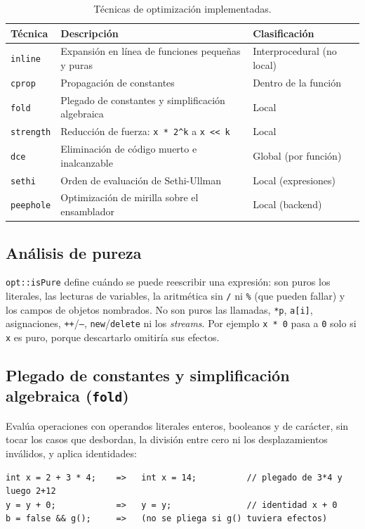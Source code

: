 \documentclass[11pt,a4paper]{article}
\newcommand{\cod}[1]{\texttt{#1}}
\begin{document}
\begin{table}[H]
\centering\small
\begin{tabular}{lp{5.3cm}p{5.2cm}}
\toprule Técnica & Descripción & Clasificación \\ \midrule
\cod{inline} & Expansión en línea de funciones pequeñas y puras & Interprocedural (no local) \\
\cod{cprop} & Propagación de constantes & Dentro de la función \\
\cod{fold} & Plegado de constantes y simplificación algebraica & Local \\
\cod{strength} & Reducción de fuerza: \cod{x * 2\textasciicircum{}k} a \cod{x << k} & Local \\
\cod{dce} & Eliminación de código muerto e inalcanzable & Global (por función) \\
\cod{sethi} & Orden de evaluación de Sethi-Ullman & Local (expresiones) \\
\cod{peephole} & Optimización de mirilla sobre el ensamblador & Local (backend) \\
\bottomrule
\end{tabular}
\caption{Técnicas de optimización implementadas.}
\end{table}

\subsection{Análisis de pureza}
\cod{opt::isPure} define cuándo se puede reescribir una expresión: son puros los literales, las lecturas de
variables, la aritmética sin \cod{/} ni \cod{\%} (que pueden fallar) y los campos de objetos nombrados. No son
puros las llamadas, \cod{*p}, \cod{a[i]}, asignaciones, \cod{++}/\cod{--}, \cod{new}/\cod{delete} ni los
\emph{streams}. Por ejemplo \cod{x * 0} pasa a \cod{0} solo si \cod{x} es puro, porque descartarlo omitiría sus
efectos.

\subsection{Plegado de constantes y simplificación algebraica (\cod{fold})}
Evalúa operaciones con operandos literales enteros, booleanos y de carácter, sin tocar los casos que desbordan, la
división entre cero ni los desplazamientos inválidos, y aplica identidades:
\begin{lstlisting}
int x = 2 + 3 * 4;    =>   int x = 14;          // plegado de 3*4 y luego 2+12
y = y + 0;            =>   y = y;               // identidad x + 0
b = false && g();     =>   (no se pliega si g() tuviera efectos)
\end{lstlisting}
\end{document}
